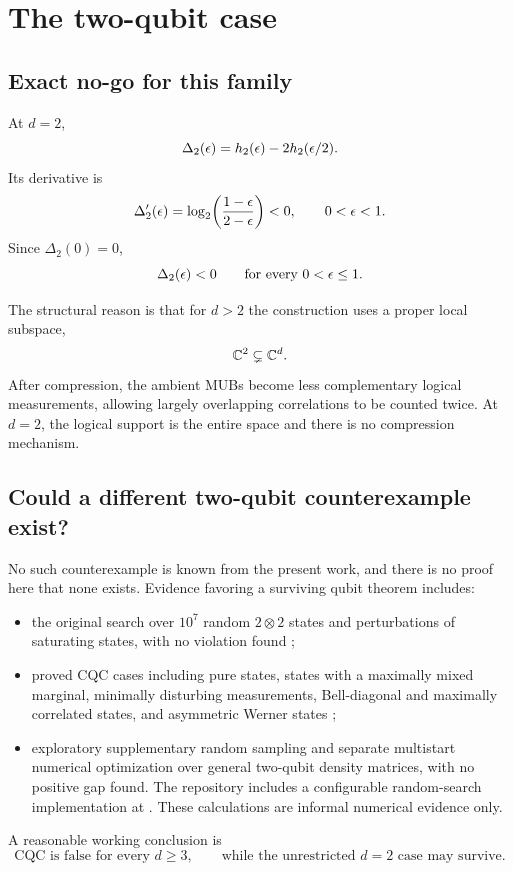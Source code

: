 \section{The two-qubit case}

\subsection{Exact no-go for this family}

At $d=2$,
\begin{equation}
\Delta_2(\epsilon)=h_2(\epsilon)-2h_2(\epsilon/2).
\end{equation}
Its derivative is
\begin{equation}
\Delta_2'(\epsilon)=\log_2\!\left(\frac{1-\epsilon}{2-\epsilon}\right)<0,
\qquad 0<\epsilon<1.
\end{equation}
Since $\Delta_2(0)=0$,
\begin{equation}
\Delta_2(\epsilon)<0\qquad\text{for every }0<\epsilon\le1.
\end{equation}

The structural reason is that for $d>2$ the construction uses a proper local subspace,
\begin{equation}
\mathbb{C}^2\subsetneq\mathbb{C}^d.
\end{equation}
After compression, the ambient MUBs become less complementary logical measurements, allowing largely overlapping correlations to be counted twice. At $d=2$, the logical support is the entire space and there is no compression mechanism.

\subsection{Could a different two-qubit counterexample exist?}

No such counterexample is known from the present work, and there is no proof here that none exists. Evidence favoring a surviving qubit theorem includes:
\begin{itemize}
\item the original search over $10^7$ random $2\otimes2$ states and perturbations of saturating states, with no violation found \cite{Schneeloch2014};
\item proved CQC cases including pure states, states with a maximally mixed marginal, minimally disturbing measurements, Bell-diagonal and maximally correlated states, and asymmetric Werner states \cite{Schneeloch2014};
\item exploratory supplementary random sampling and separate multistart numerical optimization over general two-qubit density matrices, with no positive gap found. The repository includes a configurable random-search implementation at . These calculations are informal numerical evidence only.
\end{itemize}
A reasonable working conclusion is
\begin{equation}
\text{CQC is false for every }d\ge3,
\qquad
\text{while the unrestricted }d=2\text{ case may survive.}
\end{equation}

